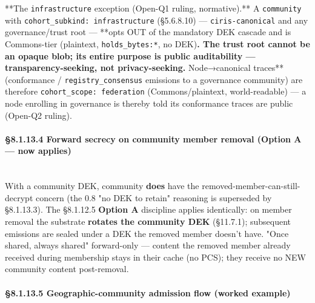 \documentclass[10pt]{article}
\begin{document}
**The \texttt{infrastructure} exception (Open-Q1 ruling, normative).** A \texttt{community} with \texttt{cohort\_subkind: infrastructure} (§5.6.8.10) — \texttt{ciris-canonical} and any governance/trust root — **opts OUT of the mandatory DEK cascade and is Commons-tier (plaintext, \texttt{holds\_bytes:*}, no DEK)\textbf{. The trust root cannot be an opaque blob; its entire purpose is public auditability — transparency-seeking, not privacy-seeking. }Node→canonical traces** (conformance / \texttt{registry\_consensus} emissions to a governance community) are therefore \texttt{cohort\_scope: federation} (Commons/plaintext, world-readable) — a node enrolling in governance is thereby told its conformance traces are public (Open-Q2 ruling).


\paragraph{§8.1.13.4 Forward secrecy on community member removal (Option A — now applies)}\mbox{}\\


With a community DEK, community \textbf{does} have the removed-member-can-still-decrypt concern (the 0.8 "no DEK to retain" reasoning is superseded by §8.1.13.3). The §8.1.12.5 \textbf{Option A} discipline applies identically: on member removal the substrate \textbf{rotates the community DEK} (§11.7.1); subsequent emissions are sealed under a DEK the removed member doesn't have. "Once shared, always shared" forward-only — content the removed member already received during membership stays in their cache (no PCS); they receive no NEW community content post-removal.


\paragraph{§8.1.13.5 Geographic-community admission flow (worked example)}\mbox{}\\
\end{document}

